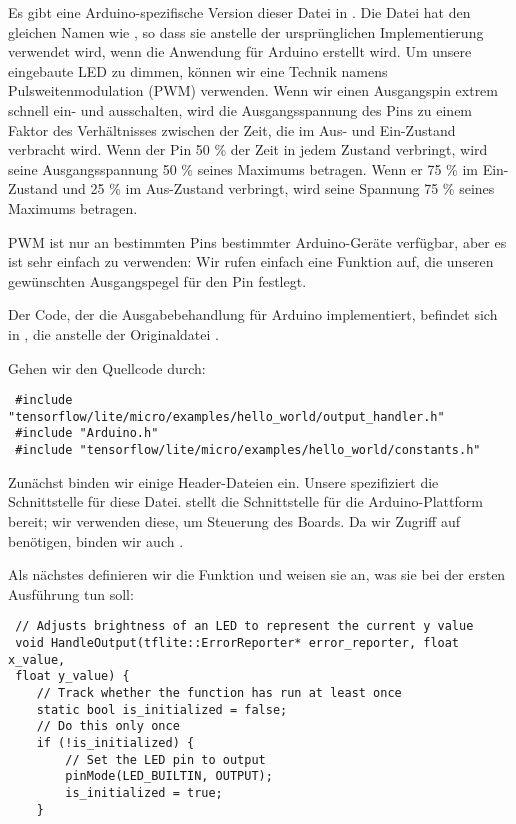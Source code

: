 Es gibt eine Arduino-spezifische Version dieser Datei in . Die Datei hat den gleichen Namen wie , so dass sie anstelle der ursprünglichen Implementierung verwendet wird, wenn die Anwendung für Arduino erstellt wird.
Um unsere eingebaute LED zu dimmen, können wir eine Technik namens Pulsweitenmodulation (PWM) verwenden. Wenn wir einen Ausgangspin extrem schnell ein- und ausschalten, wird die Ausgangsspannung des Pins zu einem Faktor des Verhältnisses zwischen der Zeit, die im Aus- und Ein-Zustand verbracht wird. Wenn der Pin 50 \% der Zeit in jedem Zustand verbringt, wird seine Ausgangsspannung 50 \% seines Maximums betragen. Wenn er 75 \% im Ein-Zustand und 25 \% im Aus-Zustand verbringt, wird seine Spannung 75 \% seines Maximums betragen.

PWM ist nur an bestimmten Pins bestimmter Arduino-Geräte verfügbar, aber es ist sehr einfach zu verwenden: Wir rufen einfach eine Funktion auf, die unseren gewünschten Ausgangspegel für den Pin festlegt.
 
 
     
 Der Code, der die Ausgabebehandlung für Arduino implementiert, befindet sich in , die anstelle der Originaldatei   .
 
 Gehen wir den Quellcode durch:
 
\begin{lstlisting}
 #include "tensorflow/lite/micro/examples/hello_world/output_handler.h"
 #include "Arduino.h"
 #include "tensorflow/lite/micro/examples/hello_world/constants.h"
\end{lstlisting} 


 Zunächst binden wir einige Header-Dateien ein. Unsere  spezifiziert die Schnittstelle für diese Datei.  stellt die Schnittstelle für die Arduino-Plattform bereit; wir verwenden diese, um Steuerung des Boards. Da wir Zugriff auf  benötigen, binden wir auch .
 
Als nächstes definieren wir die Funktion und weisen sie an, was sie bei der ersten Ausführung tun soll:

\begin{lstlisting}
 // Adjusts brightness of an LED to represent the current y value
 void HandleOutput(tflite::ErrorReporter* error_reporter, float x_value,
 float y_value) {
 	// Track whether the function has run at least once
 	static bool is_initialized = false;
 	// Do this only once
 	if (!is_initialized) {
 		// Set the LED pin to output
 		pinMode(LED_BUILTIN, OUTPUT);
 		is_initialized = true;
 	}
\end{lstlisting} 
 
